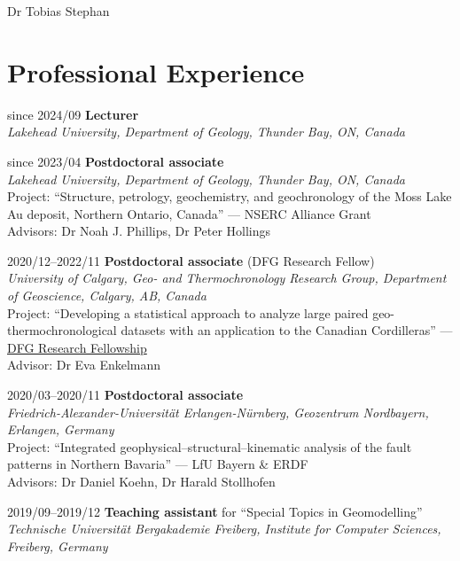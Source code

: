 \documentclass[10pt, paper=letter]{scrartcl} %
\begin{document}
\begin{cv}{\textsf{Dr Tobias Stephan}}
    \section{Professional Experience}
    \begin{cvlist}{}
        \item[since 2024/09] \textbf {Lecturer}\\ \textit{Lakehead University, Department of
            Geology, Thunder Bay, ON, Canada}

        \item[since 2023/04] \textbf{Postdoctoral associate}\\ \textit{Lakehead University,
            Department of Geology, Thunder Bay, ON, Canada}\\ Project: \enquote{Structure,
            petrology, geochemistry, and geochronology of the Moss Lake Au deposit,
            Northern Ontario, Canada} --- NSERC Alliance Grant\\ Advisors: Dr Noah J.
        Phillips, Dr Peter Hollings

        \item[2020/12--2022/11] \textbf{Postdoctoral associate} (DFG Research Fellow)\\
        \textit{University of Calgary, Geo- and Thermochronology Research Group, Department of Geoscience, Calgary, AB, Canada}\\
        Project:
        \enquote{Developing a statistical approach to analyze large paired geo-thermochronological datasets with an application to the Canadian Cordilleras} --- \href{https://gepris.dfg.de/gepris/projekt/439621066?language=en}{DFG Research Fellowship}\\
        Advisor: Dr Eva Enkelmann

        \item[2020/03--2020/11] \textbf{Postdoctoral associate}\\
        \textit{
            Friedrich-Alexander-Universit\"at Erlangen-N\"urnberg, Geozentrum Nordbayern, \mbox{Erlangen}, Germany} \\ Project: \enquote{Integrated geophysical–structural–kinematic analysis of the fault patterns in Northern Bavaria} --- LfU Bayern \& ERDF\\
        Advisors: Dr Daniel Koehn, Dr Harald Stollhofen

        \item[2019/09--2019/12] \textbf{Teaching assistant} for \enquote{Special Topics in Geomodelling}\\
        \textit{Technische Universit\"at Bergakademie Freiberg, Institute for Computer Sciences, Freiberg, Germany}


\end{cvlist}
\end{cv}
\end{document}
